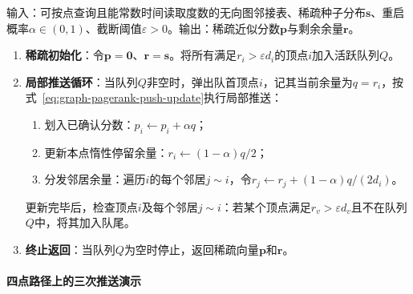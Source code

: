 \begin{algorithm}
\label{alg:graph-personalized-pagerank-push}
输入：可按点查询且能常数时间读取度数的无向图邻接表、稀疏种子分布$\bm{s}$、重启概率$\alpha\in(0,1)$、截断阈值$\varepsilon>0$。输出：稀疏近似分数$\bm{p}$与剩余余量$\bm{r}$。
\begin{enumerate}
  \item \textbf{稀疏初始化}：令$\bm{p}=\bm{0}$、$\bm{r}=\bm{s}$。将所有满足$r_i>\varepsilon d_i$的顶点$i$加入活跃队列$Q$。
  \item \textbf{局部推送循环}：当队列$Q$非空时，弹出队首顶点$i$，记其当前余量为$q=r_i$，按式~\eqref{eq:graph-pagerank-push-update}执行局部推送：
    \begin{enumerate}
    \item 划入已确认分数：$p_i\leftarrow p_i+\alpha q$；
    \item 更新本点惰性停留余量：$r_i\leftarrow(1-\alpha)q/2$；
    \item 分发邻居余量：遍历$i$的每个邻居$j\sim i$，令$r_j\leftarrow r_j+(1-\alpha)q/(2d_i)$。
    \end{enumerate}
    更新完毕后，检查顶点$i$及每个邻居$j\sim i$：若某个顶点满足$r_v>\varepsilon d_v$且不在队列$Q$中，将其加入队尾。
  \item \textbf{终止返回}：当队列$Q$为空时停止，返回稀疏向量$\bm{p}$和$\bm{r}$。
\end{enumerate}
\end{algorithm}

\paragraph{四点路径上的三次推送演示}

